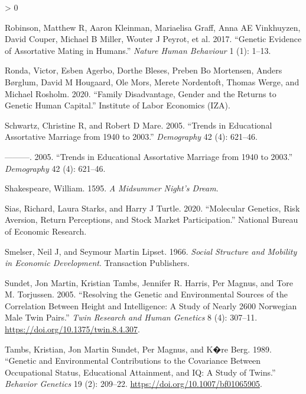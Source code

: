 \documentclass[
]{article}
\newlength{\cslhangindent}
\newenvironment{CSLReferences}[2] %
 {%
  \setlength{\parindent}{0pt}
  \ifodd #1 \everypar{\setlength{\hangindent}{\cslhangindent}}\ignorespaces\fi
  \ifnum #2 > 0
  \setlength{\parskip}{#2\baselineskip}
  \fi
 }%
 {}
\begin{document}
\begin{CSLReferences}{1}{0}
\leavevmode\hypertarget{ref-robinson2017genetic}{}%
Robinson, Matthew R, Aaron Kleinman, Mariaelisa Graff, Anna AE Vinkhuyzen, David Couper, Michael B Miller, Wouter J Peyrot, et al. 2017. {``Genetic Evidence of Assortative Mating in Humans.''} \emph{Nature Human Behaviour} 1 (1): 1--13.

\leavevmode\hypertarget{ref-ronda2020family}{}%
Ronda, Victor, Esben Agerbo, Dorthe Bleses, Preben Bo Mortensen, Anders Børglum, David M Hougaard, Ole Mors, Merete Nordentoft, Thomas Werge, and Michael Rosholm. 2020. {``Family Disadvantage, Gender and the Returns to Genetic Human Capital.''} Institute of Labor Economics (IZA).

\leavevmode\hypertarget{ref-schwartz2005trends}{}%
Schwartz, Christine R, and Robert D Mare. 2005. {``Trends in Educational Assortative Marriage from 1940 to 2003.''} \emph{Demography} 42 (4): 621--46.

\leavevmode\hypertarget{ref-schwartz2005trends}{}%
---------. 2005. {``Trends in Educational Assortative Marriage from 1940 to 2003.''} \emph{Demography} 42 (4): 621--46.

\leavevmode\hypertarget{ref-shakespeare1595midsummer}{}%
Shakespeare, William. 1595. \emph{A Midsummer Night's Dream}.

\leavevmode\hypertarget{ref-sias2020molecular}{}%
Sias, Richard, Laura Starks, and Harry J Turtle. 2020. {``Molecular Genetics, Risk Aversion, Return Perceptions, and Stock Market Participation.''} National Bureau of Economic Research.

\leavevmode\hypertarget{ref-smelser1966social}{}%
Smelser, Neil J, and Seymour Martin Lipset. 1966. \emph{Social Structure and Mobility in Economic Development}. Transaction Publishers.

\leavevmode\hypertarget{ref-Sundet_2005}{}%
Sundet, Jon Martin, Kristian Tambs, Jennifer R. Harris, Per Magnus, and Tore M. Torjussen. 2005. {``Resolving the Genetic and Environmental Sources of the Correlation Between Height and Intelligence: A Study of Nearly 2600 Norwegian Male Twin Pairs.''} \emph{Twin Research and Human Genetics} 8 (4): 307--11. \url{https://doi.org/10.1375/twin.8.4.307}.

\leavevmode\hypertarget{ref-Tambs_1989}{}%
Tambs, Kristian, Jon Martin Sundet, Per Magnus, and K�re Berg. 1989. {``Genetic and Environmental Contributions to the Covariance Between Occupational Status, Educational Attainment, and {IQ}: A Study of Twins.''} \emph{Behavior Genetics} 19 (2): 209--22. \url{https://doi.org/10.1007/bf01065905}.


\end{CSLReferences}
\end{document}
